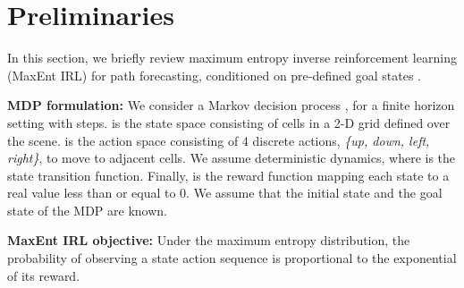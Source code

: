 \documentclass[journal]{IEEEtran}
\begin{document}
 



 

 
























































\section{Preliminaries}

In this section, we briefly review maximum entropy inverse reinforcement learning (MaxEnt IRL) for path forecasting, conditioned on pre-defined goal states \cite{ziebart2009planning, kitani2012activity, wulfmeier2016watch}.

\vspace{0.1in}
\noindent\textbf{MDP formulation:} We consider a Markov decision process , for a finite horizon setting with  steps.  is the state space consisting of cells in a 2-D grid defined over the scene.  is the action space consisting of 4 discrete actions, \textit{\{up, down, left, right\}}, to move to adjacent cells.  We assume deterministic dynamics, where  is the state transition function. Finally,  is the reward function mapping each state to a real value less than or equal to 0. We assume that the initial state  and the goal state  of the MDP are known.

\vspace{0.1in}
\noindent\textbf{MaxEnt IRL objective:} Under the maximum entropy distribution, the probability of observing a state action sequence  is proportional to the exponential of its reward.
\end{document}
